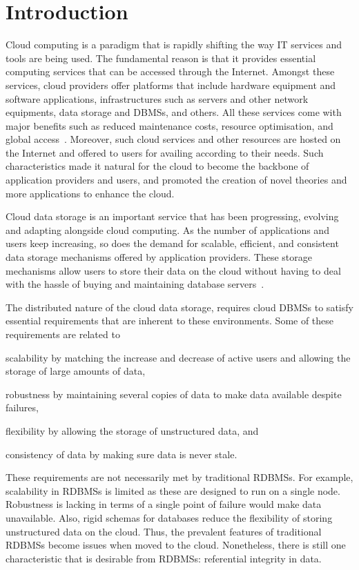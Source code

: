\chapter{Introduction}

% 
  
Cloud computing is a paradigm that is rapidly shifting the way IT services and
tools are being used. The fundamental reason is that it provides essential
computing services that can be accessed through the Internet. Amongst these
services, cloud providers offer platforms that include hardware equipment and
software applications, infrastructures such as servers and other  network
equipments, data storage and \acp{DBMS}, and others. All these services come
with major benefits such as reduced maintenance costs,  resource optimisation,
and global access~\citep{wilkes}. Moreover, such cloud services and other
resources are hosted on the Internet and offered to users for  availing
according to their needs.  Such characteristics made it natural for the  cloud
to become  the backbone of application providers and   users, and promoted the
creation of novel theories and more applications to enhance the cloud.
 
  
Cloud data storage is an important service that has been progressing, evolving
and adapting alongside cloud computing. As the number of applications and users
keep increasing, so does the demand for scalable, efficient, and consistent data
storage mechanisms offered by application providers. These storage mechanisms
allow  users to store their data on the cloud without
having to deal with the hassle of buying and maintaining database
servers~\citep{SNIA}.

The distributed nature of the cloud data storage, requires cloud \acp{DBMS} to
satisfy essential requirements that are inherent to these environments. Some of
these requirements are related to \begin{inparaenum}[a)] \item  scalability by
matching the increase and decrease of active users and allowing the storage of
large amounts of data, \item  robustness by maintaining several copies of data
to make data available despite failures, \item  flexibility by allowing the
storage of unstructured data, and \item  consistency of data by making sure data
is never stale.
	\end{inparaenum}	
These requirements are not necessarily met by traditional \acp{RDBMS}. For
example, scalability in \acp{RDBMS} is limited as these are designed to run on a
single node. Robustness is lacking in terms of  a single point of failure would
make data unavailable. Also,  rigid schemas for databases reduce the flexibility
of storing unstructured data on the cloud. Thus, the prevalent features of
traditional \acp{RDBMS} become issues when moved to the cloud. Nonetheless,
there is still one characteristic that is desirable from \acp{RDBMS}:
referential integrity in data.
   

